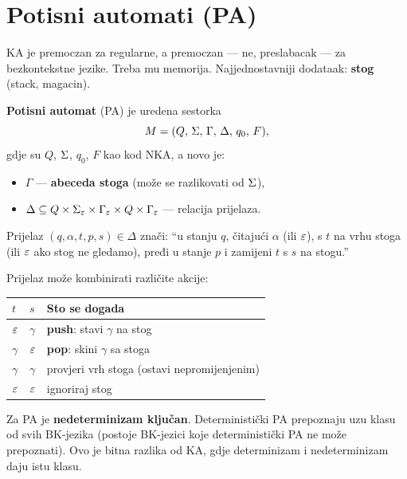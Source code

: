 \section{Potisni automati (PA)}

KA je premoczan za regularne, a premoczan --- ne, preslabacak ---
za bezkontekstne jezike. Treba mu memorija. Najjednostavniji dodataak:
\textbf{stog} (stack, magacin).

\begin{definicija}
\textbf{Potisni automat} (PA) je uredena sestorka
\[
  M = (Q,\, \Sigma,\, \Gamma,\, \Delta,\, q_0,\, F),
\]
gdje su $Q$, $\Sigma$, $q_0$, $F$ kao kod NKA, a novo je:
\begin{itemize}
  \item $\Gamma$ --- \textbf{abeceda stoga} (može se razlikovati od $\Sigma$),
  \item $\Delta \subseteq Q \times \Sigma_\varepsilon \times \Gamma_\varepsilon \times Q \times \Gamma_\varepsilon$
        --- relacija prijelaza.
\end{itemize}
Prijelaz $(q, \alpha, t, p, s) \in \Delta$ znači: ``u stanju $q$, čitajući
$\alpha$ (ili $\varepsilon$), s $t$ na vrhu stoga (ili $\varepsilon$ ako stog ne gledamo),
pređi u stanje $p$ i zamijeni $t$ s $s$ na stogu.''
\end{definicija}

Prijelaz može kombinirati različite akcije:
\begin{center}
\renewcommand{\arraystretch}{1.4}
\begin{tabular}{lll}
\hline
$t$ & $s$ & Sto se dogada \\
\hline
$\varepsilon$ & $\gamma$ & \textbf{push}: stavi $\gamma$ na stog \\
$\gamma$ & $\varepsilon$ & \textbf{pop}: skini $\gamma$ sa stoga \\
$\gamma$ & $\gamma$ & provjeri vrh stoga (ostavi nepromijenjenim) \\
$\varepsilon$ & $\varepsilon$ & ignoriraj stog \\
\hline
\end{tabular}
\end{center}

\begin{napomena}
Za PA je \textbf{nedeterminizam ključan}. Deterministički PA prepoznaju
uzu klasu od svih BK-jezika (postoje BK-jezici koje deterministički
PA ne može prepoznati). Ovo je bitna razlika od KA, gdje
determinizam i nedeterminizam daju istu klasu.
\end{napomena}

